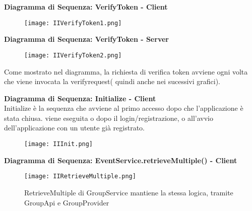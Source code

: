 \textbf{Diagramma di Sequenza: VerifyToken - Client}\\
\begin{figure}[h!]
    \begin{center}
        \texttt{[image: IIVerifyToken1.png]}
    \end{center}
\end{figure}
\clearpage
\textbf{Diagramma di Sequenza: VerifyToken - Server}\\
\begin{figure}[h!]
    \begin{center}
        \texttt{[image: IIVerifyToken2.png]}
    \end{center}
\end{figure}

Come mostrato nel diagramma, la richiesta di verifica token avviene ogni volta che viene invocata la verifyrequest( quindi anche nei sucessivi grafici).
\clearpage

\textbf{Diagramma di Sequenza: Initialize - Client}\\
Initialize è la sequenza che avviene al primo accesso dopo che l'applicazione è stata chiusa. viene eseguita o dopo il login/registrazione, o all'avvio dell'applicazione con un utente già registrato.
\begin{figure}[h!]
    \begin{center}
        \texttt{[image: IIInit.png]}
    \end{center}
\end{figure}

\textbf{Diagramma di Sequenza: EventService.retrieveMultiple() - Client}\\
\begin{figure}[h!]
    \begin{center}
        \begin{minipage}{0.5\textwidth}
            \texttt{[image: IIRetrieveMultiple.png]}
        \end{minipage}
        \begin{minipage}{0.4\textwidth}
            RetrieveMultiple di GroupService mantiene la stessa logica, tramite GroupApi e GroupProvider
        \end{minipage}
    \end{center}
\end{figure}
\clearpage

